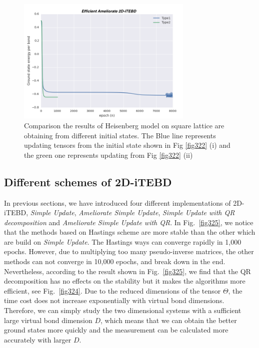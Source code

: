 \begin{figure}[ht]
	\centering
	\includegraphics[width=0.75\textwidth]{figures/fig323.png}
	\caption[Comparison the results of Heisenberg model on square lattice which are obtaining from different initial states.]{Comparison the results of Heisenberg model on square lattice are obtaining from different initial states. The Blue line represents updating tensors from the initial state shown in Fig \ref{fig322} (i) and the green one represents updating from Fig \ref{fig322} (ii)}

	\label{fig323}
\end{figure}

\subsection{Different schemes of 2D-iTEBD}

In previous sections, we have introduced four different implementations of 2D-iTEBD, \textit{Simple Update}, \textit{Ameliorate Simple Update}, \textit{Simple Update with QR decomposition} and \textit{Ameliorate Simple Update with QR}. In Fig.~\ref{fig325}, we notice that the methods based on Hastings scheme are more stable than the other which are build on \textit{Simple Update}. The Hastings ways can converge rapidly in 1,000 epochs. However, due to multiplying too many pseudo-inverse matrices, the other methods can not converge in 10,000 epochs, and break down in the end. Nevertheless, according to the result shown in Fig.~\ref{fig325}, we find that the QR decomposition has no effects on the stability but it makes the algorithms more efficient, see Fig.~\ref{fig324}. Due to the reduced dimensions of the tensor $\Theta$, the time cost does not increase exponentially with virtual bond dimensions. Therefore, we can simply study the two dimensional systems with a sufficient large virtual bond dimension $D$, which means that we can obtain the better ground states more quickly and the measurement can be calculated more accurately with larger $D$.

